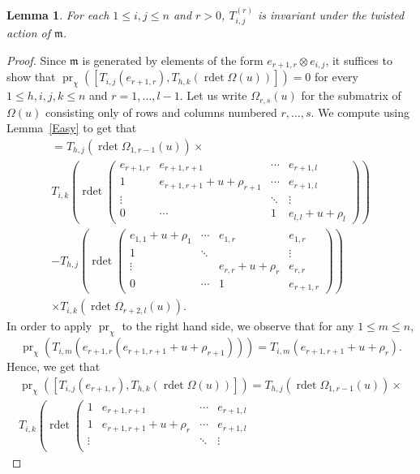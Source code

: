 \documentclass[twoside,12pt,reqno]{amsart}
\newtheorem{Lemma}[Proposition]{Lemma}
\def\rdet{\operatorname{rdet}}
\def\pr{{\operatorname{pr}}}
\begin{document}
\begin{Lemma}\label{inv}
For each $1 \leq i,j \leq n$ and $r > 0$,
$T_{i,j}^{(r)}$ is invariant under the twisted action
of $\mathfrak{m}$.
\end{Lemma}

\begin{proof}
Since $\mathfrak m$ is generated by elements of the form
$e_{r+1,r} \otimes e_{i,j}$, it suffices to show that 
$\pr_\chi ([T_{i,j}(e_{r+1,r}),T_{h,k}(\rdet \Omega(u))]) = 0$
for every $1 \leq h,i,j,k \leq n$ and 
$r = 1,\dots,l-1$.
Let us write $\Omega_{r, s}(u)$ for the submatrix of
$\Omega(u)$ consisting only of rows and columns 
numbered $r,\dots,s$.
We compute using Lemma~\ref{Easy} to get that
\begin{multline*}
[T_{i,j}(e_{r+1,r}), T_{h,k}(\rdet \Omega(u))]
=T_{h,j}(\rdet \Omega_{1, r-1}(u))\times\\
T_{i,k}
\left(
\rdet
\left(
\begin{array}{ccccc}
e_{r+1,r}&e_{r+1,r+1}&\cdots&e_{r+1,l}\\
1&e_{r+1,r+1}+u+\rho_{r+1} &\cdots & e_{r+1,l}\\\vdots&&\ddots&\vdots\\
0&\cdots&1&e_{l,l}+u+\rho_l
\end{array}
\right)\right)\\
-
T_{h,j}
\left(
\rdet 
 \left(
\begin{array}{ccccc}
e_{1,1}+u+\rho_1 &\cdots & e_{1,r}&e_{1,r}\\
1&\ddots&&\vdots\\
\vdots&&e_{r,r} +u+\rho_r&e_{r,r}\\
0&\cdots&1&e_{r+1,r}
\end{array}
\right)\right)\\
\times T_{i,k}(\rdet \Omega_{r+2, l}(u)).
\end{multline*}
In order to apply $\pr_\chi$ to the right hand side, we observe 
that for any $1 \leq m \leq n$,
$$
\pr_\chi \left(T_{i,m}\left(e_{r+1,r} \left(e_{r+1,r+1}+u +\rho_{r+1}\right)\right)\right)
=
T_{i,m}\left(e_{r+1,r+1} +u +\rho_r\right).
$$
Hence,
we get that
\begin{multline*}
\pr_\chi ([T_{i,j}(e_{r+1,r}), T_{h,k}(\rdet \Omega(u))])
=
T_{h,j}(\rdet \Omega_{1,r-1}(u))\times\\
T_{i,k}
\left(
\rdet
\left(
\begin{array}{ccccc}
1&e_{r+1,r+1}&\cdots&e_{r+1,l}\\
1&e_{r+1,r+1}+u +\rho_r &\cdots & e_{r+1,l}\\\vdots&&\ddots&\vdots\\

\end{array}
\end{multline*}
\end{proof}
\end{document}
